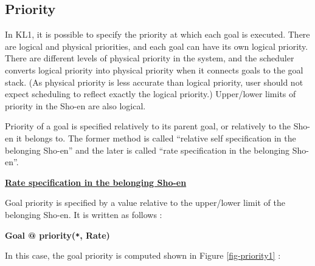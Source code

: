\subsection{Priority}
\label{sec-priority}

In KL1, it is possible to specify the priority at which each goal is executed.
There are logical and physical priorities, and each goal can have its own
logical priority.
There are different levels of physical priority in the system, and
the scheduler converts logical priority into physical priority when it
connects goals to the goal stack. (As physical priority is less accurate than
logical priority, user should not expect scheduling to reflect exactly the
logical priority.) Upper/lower limits of priority in the Sho-en are also
logical.

Priority of a goal is specified relatively to its
parent goal, or relatively to the Sho-en it belongs to.
The former method is called ``relative self specification in the belonging
Sho-en'' and the later is called ``rate specification in the belonging
Sho-en''.
\vspace{1ex}

\noindent\underline{\bf Rate specification in the belonging Sho-en}
\vspace{1ex}\par
Goal priority is specified by a value relative to the upper/lower limit of the
belonging Sho-en. It is written as follows :
\begin{center}
{\bf Goal @ priority(\verb|*|, Rate)}
\end{center}
In this case, the goal priority is computed shown 
in Figure \ref{fig-priority1} :

